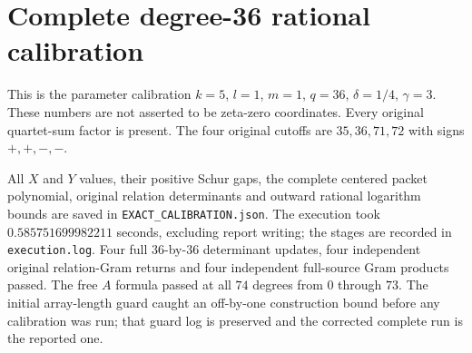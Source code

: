 \section{Complete degree-36 rational calibration}
This is the parameter calibration
$k=5$, $l=1$, $m=1$, $q=36$, $\delta=1/4$, $\gamma=3$.
These numbers are not asserted to be zeta-zero coordinates.
Every original quartet-sum factor is present. The four original cutoffs
are $35,36,71,72$ with signs $+,+,-,-$.

All $X$ and $Y$ values, their positive Schur gaps, the complete centered
packet polynomial, original relation determinants and outward rational
logarithm bounds are saved in \texttt{EXACT\_CALIBRATION.json}.
The execution took $0.585751699982211$ seconds, excluding report writing;
the stages are recorded in \texttt{execution.log}. Four full $36$-by-$36$
determinant updates, four independent original relation-Gram returns
and four independent full-source Gram products passed. The free $A$
formula passed at all $74$ degrees from $0$ through $73$. The initial
array-length guard caught an off-by-one construction bound before any
calibration was run; that guard log is preserved and the corrected
complete run is the reported one.

